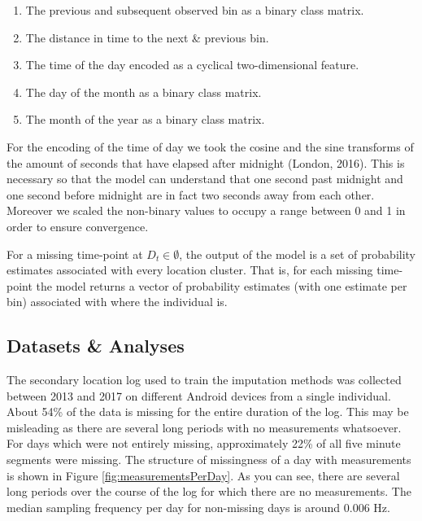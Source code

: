 \documentclass[man]{apa6}
\providecommand{\tightlist}{%
  \setlength{\itemsep}{0pt}\setlength{\parskip}{0pt}}
\theoremstyle{definition}
\theoremstyle{definition}
\theoremstyle{definition}
\theoremstyle{remark}
\begin{document}
\begin{enumerate}
\def\labelenumi{\arabic{enumi}.}
\tightlist
\item
  The previous and subsequent observed bin as a binary class matrix.
\item
  The distance in time to the next \& previous bin.
\item
  The time of the day encoded as a cyclical two-dimensional feature.
\item
  The day of the month as a binary class matrix.
\item
  The month of the year as a binary class matrix.
\end{enumerate}

For the encoding of the time of day we took the cosine and the sine
transforms of the amount of seconds that have elapsed after midnight
(London, 2016). This is necessary so that the model can understand that
one second past midnight and one second before midnight are in fact two
seconds away from each other. Moreover we scaled the non-binary values
to occupy a range between 0 and 1 in order to ensure convergence.

For a missing time-point at \(D_t \in \emptyset\), the output of the
model is a set of probability estimates associated with every location
cluster. That is, for each missing time-point the model returns a vector
of probability estimates (with one estimate per bin) associated with
where the individual is.

\subsection{Datasets \& Analyses}\label{datasets-analyses}

The secondary location log used to train the imputation methods was
collected between 2013 and 2017 on different Android devices from a
single individual. About 54\% of the data is missing for the entire
duration of the log. This may be misleading as there are several long
periods with no measurements whatsoever. For days which were not
entirely missing, approximately 22\% of all five minute segments were
missing. The structure of missingness of a day with measurements is
shown in Figure \ref{fig:measurementsPerDay}. As you can see, there are
several long periods over the course of the log for which there are no
measurements. The median sampling frequency per day for non-missing days
is around 0.006 Hz.
\end{document}

